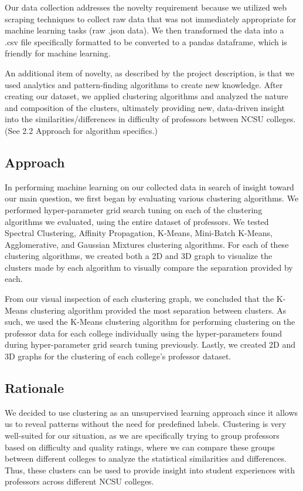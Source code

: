 \documentclass[sigconf,nonacm]{acmart}
\begin{document}
Our data collection addresses the novelty requirement because we utilized web scraping techniques to collect raw data that was not immediately appropriate for machine learning tasks (raw .json data). We then transformed the data into a .csv file specifically formatted to be converted to a pandas dataframe, which is friendly for machine learning.

An additional item of novelty, as described by the project description, is that we used analytics and pattern-finding algorithms to create new knowledge. After creating our dataset, we applied clustering algorithms and analyzed the nature and composition of the clusters, ultimately providing new, data-driven insight into the similarities/differences in difficulty of professors between NCSU colleges. (See 2.2 Approach for algorithm specifics.)

\subsection{Approach}
In performing machine learning on our collected data in search of insight toward our main question, we first began by evaluating various clustering algorithms. We performed hyper-parameter grid search tuning on each of the clustering algorithms we evaluated, using the entire dataset of professors. We tested Spectral Clustering, Affinity Propagation, K-Means, Mini-Batch K-Means, Agglomerative, and Gaussian Mixtures clustering algorithms. For each of these clustering algorithms, we created both a 2D and 3D graph to visualize the clusters made by each algorithm to visually compare the separation provided by each.

From our visual inspection of each clustering graph, we concluded that the K-Means clustering algorithm provided the most separation between clusters. As such, we used the K-Means clustering algorithm for performing clustering on the professor data for each college individually using the hyper-parameters found during hyper-parameter grid search tuning previously. Lastly, we created 2D and 3D graphs for the clustering of each college's professor dataset.

\subsection{Rationale}
We decided to use clustering as an unsupervised learning approach since it allows us to reveal patterns without the need for predefined labels. Clustering is very well-suited for our situation, as we are specifically trying to group professors based on difficulty and quality ratings, where we can compare these groups between different colleges to analyze the statistical similarities and differences. Thus, these clusters can be used to provide insight into student experiences with professors across different NCSU colleges.
\end{document}
